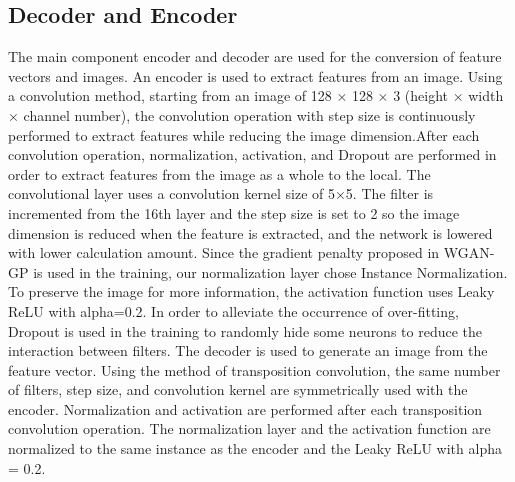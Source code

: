 \subsection{Decoder and Encoder}
The main component encoder and decoder are used for the conversion of feature vectors and images.
An encoder is used to extract features from an image. Using a convolution method, starting from an image of 128 × 128 × 3 (height × width × channel number),
the convolution operation with step size is continuously performed to extract features while reducing the image dimension.After each convolution operation, normalization, activation, and Dropout are performed in order to extract features from the image as a whole to the local.
The convolutional layer uses a convolution kernel size of 5×5. The filter is incremented from the 16th layer and the step size is set to 2 so the image dimension is reduced when the feature is extracted, and the network is lowered with lower calculation amount.
Since the gradient penalty proposed in WGAN-GP is used in the training, our normalization layer chose Instance Normalization. To preserve the image for more information, the activation function uses Leaky ReLU with alpha=0.2. In order to alleviate the occurrence of over-fitting, Dropout is used in the training to randomly hide some neurons to reduce the interaction between filters.
The decoder is used to generate an image from the feature vector. 
Using the method of transposition convolution, the same number of filters, step size, and convolution kernel are symmetrically used with the encoder. Normalization and activation are performed after each transposition convolution operation. 
The normalization layer and the activation function are normalized to the same instance as the encoder and the Leaky ReLU with alpha = 0.2.
